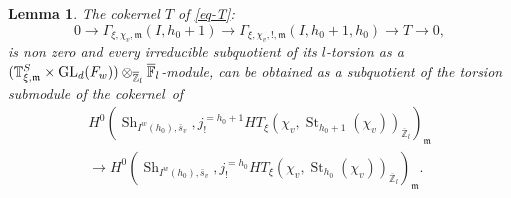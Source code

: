 \documentclass[11pt]{article}
\DeclareMathOperator{\GL}{GL}
\theoremstyle{plain}
\newtheorem{lemma}[equation]{Lemma}
\theoremstyle{definition}
\numberwithin{equation}{subsection}
\newcommand\Tm{{\mathbb T}}
\newcommand\Fm{{\mathbb F}}
\newcommand\Zm{{\mathbb Z}}
\DeclareMathOperator{\sh}{Sh}
\DeclareMathOperator{\st}{St}
\begin{document}
\begin{lemma} \label{lem-important}
The cokernel $T$ of \eqref{eq-T}:\vspace*{-3pt}
\[
0 \to \Gamma_{\xi,\chi_v,\mathfrak m}(I,h_0+1)
\to \Gamma_{\xi,\chi_v,!,\mathfrak m}
(I,h_0+1,h_0) \to T \to 0,
\]
is non zero and every irreducible subquotient of its $l$-torsion as a
$(\Tm_{\xi,\mathfrak m}^S \times\nobreak \GL_d(F_w)) \otimes_{\overline \Zm_l} \overline \Fm_l$-module,
can be obtained as a subquotient of the torsion submodule of
the cokernel~of\vspace*{-3pt}
\begin{multline} \label{eq-torsion-trop2}
H^{0}(\sh_{I^w(h_0),\bar s_v},j^{=h_0+1}_!
HT_\xi(\chi_v,\st_{h_0+1}(\chi_v))_{\overline \Zm_l})_{\mathfrak m} \\
\to H^0(\sh_{I^w(h_0),\bar s_v},j^{=h_0}_!
HT_\xi(\chi_v,\st_{h_0}(\chi_v))_{\overline \Zm_l})_{\mathfrak m}.
\end{multline}
\end{lemma}
\end{document}
